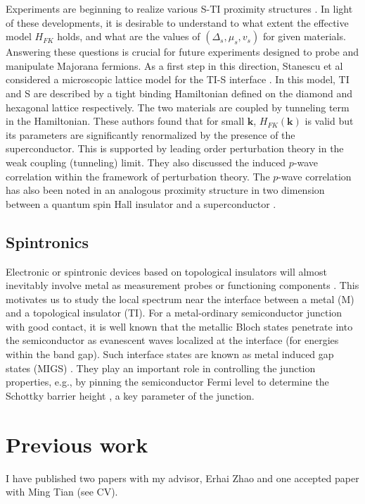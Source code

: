 \documentclass[12pt,twocolumn]{article}
\begin{document}
Experiments are beginning to realize various S-TI proximity structures \cite{sca,march}.
In light of these developments, it is desirable to
understand to what extent the effective model $H_{FK}$ holds,
and what are the values of $(\Delta_s,\mu_s,v_s)$ for given materials. 
Answering these questions is crucial for future experiments designed to probe
and manipulate Majorana fermions. As a first step in this
direction, Stanescu et al considered a microscopic lattice model
for the TI-S interface \cite{stan}. In this model, TI and S are described by a tight binding 
Hamiltonian defined on the diamond and hexagonal lattice respectively.
The two materials are coupled by tunneling term in the Hamiltonian. 
These authors found that 
for small $\mathbf{k}$, $H_{FK}(\mathbf{k})$ is valid but its parameters are 
significantly renormalized by the presence of the superconductor. 
This is supported by leading order 
perturbation theory in the weak coupling (tunneling) limit. They also
discussed the induced $p$-wave correlation within the framework of
perturbation theory. The $p$-wave correlation has also been noted in 
an analogous proximity structure in two dimension between
a quantum spin Hall insulator and a superconductor \cite{ann}.



\subsection*{Spintronics}
Electronic or spintronic devices based on topological insulators will almost inevitably involve metal as measurement probes or functioning components \cite{yokoyama09}. This motivates us to study the local spectrum near the interface between a metal (M) and a topological insulator (TI). For a metal-ordinary semiconductor junction with good contact, it is well known that the metallic Bloch states penetrate into the semiconductor as evanescent waves localized at the interface (for energies within the band gap). Such interface states are known as metal induced gap states (MIGS) \cite{heine65,cohen}. They play an important role in controlling the junction properties, e.g., by pinning the semiconductor Fermi level to determine the Schottky barrier height \cite{tersoff}, a key parameter of the junction.



\clearpage
\section*{Previous work}
I have published two papers with my advisor, Erhai Zhao and one accepted paper with Ming Tian (see CV). 
\end{document}
